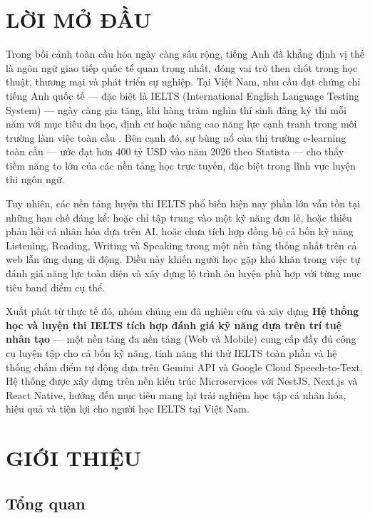 \documentclass[a4paper,12pt]{extreport}
\begin{document}
\newpage
{} 
\setcounter{page}{1}
\pagestyle{mainstyle} 

\chapter*{LỜI MỞ ĐẦU}
\thispagestyle{mainstyle} 
Trong bối cảnh toàn cầu hóa ngày càng sâu rộng, tiếng Anh đã khẳng định vị thế là ngôn ngữ giao tiếp quốc tế quan trọng nhất, đóng vai trò then chốt trong học thuật, thương mại và phát triển sự nghiệp. Tại Việt Nam, nhu cầu đạt chứng chỉ tiếng Anh quốc tế — đặc biệt là IELTS (International English Language Testing System) — ngày càng gia tăng, khi hàng trăm nghìn thí sinh đăng ký thi mỗi năm với mục tiêu du học, định cư hoặc nâng cao năng lực cạnh tranh trong môi trường làm việc toàn cầu \cite{ielts-global-stats}. Bên cạnh đó, sự bùng nổ của thị trường e-learning toàn cầu — ước đạt hơn 400 tỷ USD vào năm 2026 theo Statista \cite{statista-elearning} — cho thấy tiềm năng to lớn của các nền tảng học trực tuyến, đặc biệt trong lĩnh vực luyện thi ngôn ngữ.

Tuy nhiên, các nền tảng luyện thi IELTS phổ biến hiện nay phần lớn vẫn tồn tại những hạn chế đáng kể: hoặc chỉ tập trung vào một kỹ năng đơn lẻ, hoặc thiếu phản hồi cá nhân hóa dựa trên AI, hoặc chưa tích hợp đồng bộ cả bốn kỹ năng Listening, Reading, Writing và Speaking trong một nền tảng thống nhất trên cả web lẫn ứng dụng di động. Điều này khiến người học gặp khó khăn trong việc tự đánh giá năng lực toàn diện và xây dựng lộ trình ôn luyện phù hợp với từng mục tiêu band điểm cụ thể.

Xuất phát từ thực tế đó, nhóm chúng em đã nghiên cứu và xây dựng \textbf{Hệ thống học và luyện thi IELTS tích hợp đánh giá kỹ năng dựa trên trí tuệ nhân tạo} — một nền tảng đa nền tảng (Web và Mobile) cung cấp đầy đủ công cụ luyện tập cho cả bốn kỹ năng, tính năng thi thử IELTS toàn phần và hệ thống chấm điểm tự động dựa trên Gemini API và Google Cloud Speech-to-Text. Hệ thống được xây dựng trên nền kiến trúc Microservices với NestJS, Next.js và React Native, hướng đến mục tiêu mang lại trải nghiệm học tập cá nhân hóa, hiệu quả và tiện lợi cho người học IELTS tại Việt Nam.

\chapter{GIỚI THIỆU}

\section{Tổng quan}
\end{document}

